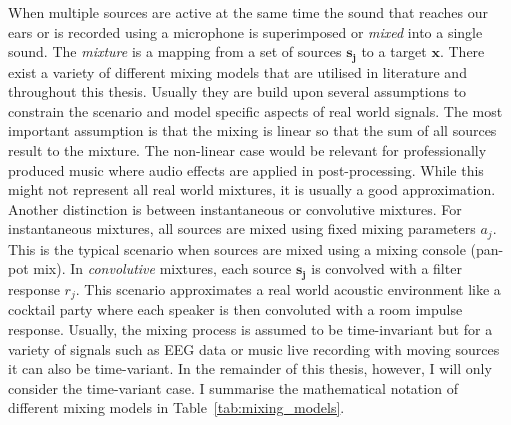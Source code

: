 When multiple sources are active at the same time the sound that reaches our ears or is recorded using a microphone is superimposed or \emph{mixed} into a single sound.
The \emph{mixture} is a mapping from a set of sources
\(\mathbf{s_j}\) to a target \(\mathbf{x}\).
There exist a variety of different mixing models that are utilised in literature and throughout this thesis.
Usually they are build upon several assumptions to constrain the scenario and model specific aspects of real world signals.
The most important assumption is that the mixing is linear so that the sum of all sources result to the mixture.
The non-linear case would be relevant for professionally produced music where audio effects are applied in post-processing.
While this might not represent all real world mixtures, it is usually a good approximation.
Another distinction is between instantaneous or convolutive mixtures.
For instantaneous mixtures, all sources are mixed using fixed mixing parameters \(a_j\).
This is the typical scenario when sources are mixed using a mixing console (pan-pot mix).
In \emph{convolutive} mixtures, each source \(\mathbf{s_j}\) is convolved with a filter response \(r_j\).
This scenario approximates a real world acoustic environment like a cocktail party where each speaker is then convoluted with a room impulse response.
Usually, the mixing process is assumed to be time-invariant but for a variety of signals such as EEG data or music live recording with moving sources it can also be time-variant.
In the remainder of this thesis, however, I will only consider the time-variant case.
I summarise the mathematical notation of different mixing models in Table~\ref{tab:mixing_models}.


